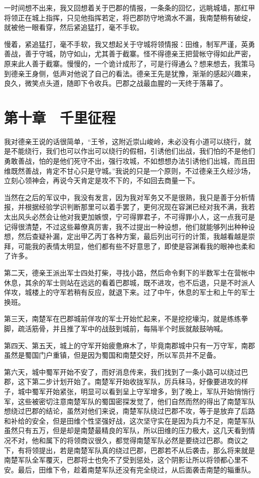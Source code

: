 一时间想不出来，我又回想着关于巴郡的情报，一条条的回忆，远眺城墙，那红甲将领正在城上指挥，只见他指挥若定，将巴郡防守地滴水不漏，我南楚稍有破绽，就被他一眼看穿，然后紧追猛打，毫不手软。

慢着，紧追猛打，毫不手软，我又想起关于守城将领情报：田维，制军严谨，英勇善战，善于守城，防守如山，尤其善于截寨。怪不得德亲王把营帐守得如此严密，原来此人善于截寨。慢慢的，一个诡计成形了，可是行得通么？想来想去，我策马到德亲王身侧，低声对他说了自己的看法。德亲王先是犹豫，渐渐的感起兴趣来，良久，微笑点头道，随即下令收兵。巴郡之战最血腥的一天终于落幕了。

\chapter{第十章　千里征程}

我对德亲王说的话很简单，“王爷，这附近崇山峻岭，未必没有小道可以绕行，就是不能绕行，我们也可以作出可以绕行的假相，引诱他们出战，我们怕的不是他们勇敢善战，怕的是他们死守不出，强行攻城，不如想想办法引诱他们出城，而且田维既然善战，肯定不甘心只是守城。”我说的只是一个原则，不过德亲王久经沙场，立刻心领神会，再说今天肯定是攻不下的，不如回去商量一下。

当然在之后的军议中，我没有发言，因为我对军务又不是很熟，我只是善于分析情报，并根据经验学识判断那里可以着手罢了，更何况现在容渊已经对我不满，我若太出风头必然会让他对我更加嫉恨，宁可得罪君子，不可得罪小人，这一点我可是记得很清楚，不过这些幕僚真厉害，我不过提出一种设想，他们就能够列出种种设想，然后查疑补漏，定出甲乙丙丁各种方案，最后列出可行的计策，我越看越是崇拜，可能我的表情太明显，他们都有些不好意思了，即使是容渊看我的眼神也柔和了许多。

第二天，德亲王派出军士四处打柴，寻找小路，然后命令剩下的半数军士在营帐中休息，其余的军士则站在远远的看着巴郡城，既不进攻，也不后退，只是不时派人佯攻，城楼上的守军若稍有反应，就退下来。过了中午，休息的军士和上午的军士换班。

第三天，南楚军在巴郡城前佯攻的军士开始忙起来，不是挖挖壕沟，就是练练拳脚，疏活筋骨，并且推了军中的战鼓到城前，每隔半个时辰就敲鼓呐喊。

第四天、第五天，城上的守军开始疲惫麻木了，毕竟南郡城中只有一万守军，南郡虽然是蜀国门户重镇，但是因为蜀国和南楚交好，所以军员并不足备。

第六天，城中蜀军开始不安了，而好消息传来，我们找到了一条小路可以绕过巴郡，这下第二步计划开始了。南楚军开始收拢军队，厉兵秣马，好像要进攻的样子，城中蜀军开始紧张，明显可以看到呈上守军增多，到了晚上，军队开始悄悄行军，这些被密切注意南楚军队的蜀国密探发觉了，他们自然而然的得出了南楚军队想绕过巴郡的结论，虽然对他们来说，南楚军队绕过巴郡不攻，等于是放弃了后路和补给的安全，但是田维个性坚强好战，这次坚守实在是因为兵力不足，南楚军队虽然只有五万，但是却是南楚最精良的军队，所以田维的压力极大，这几天看到情况不对，他和属下的将领商议很久，都觉得南楚军队必然是要绕过巴郡。商议之下，有将领提出，若是南楚军队真的绕过巴郡，巴郡若不从后袭击，那么将来就是南楚军队全军覆灭，巴郡将士也免不了受到惩处，这个阴影让所以将领都心里不安。最后，田维下令，趁着南楚军队还没有完全绕过，从后面袭击南楚的辎重队。


